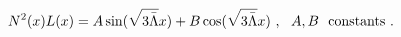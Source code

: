 \begin{equation}
N^2(x)L(x)=A\sin(\sqrt{3\bar\Lambda}x)+B\cos(\sqrt{3\bar\Lambda}x) \ , \ \ A, B \ \ {\rm constants} \ .
\end{equation}

